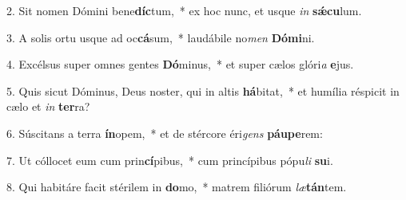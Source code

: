 2. Sit nomen Dómini bene\textbf{díc}tum,~*  ex hoc nunc, et usque \textit{in} \textbf{sǽ}\textbf{cu}lum.\

3. A solis ortu usque ad oc\textbf{cá}sum,~*  laudábile no\textit{men} \textbf{Dó}\textbf{mi}ni.\

4. Excélsus super omnes gentes \textbf{Dó}minus,~*  et super cælos glóri\textit{a} \textbf{e}jus.\

5. Quis sicut Dóminus, Deus noster, qui in altis \textbf{há}bitat,~*  et humília réspicit in cælo et \textit{in} \textbf{ter}ra?\

6. Súscitans a terra \textbf{ín}opem,~*  et de stércore éri\textit{gens} \textbf{páu}\textbf{pe}rem:\

7. Ut cóllocet eum cum prin\textbf{cí}pibus,~*  cum princípibus pópu\textit{li} \textbf{su}i.\

8. Qui habitáre facit stérilem in \textbf{do}mo,~*  matrem filiórum \textit{læ}\textbf{tán}tem.\

